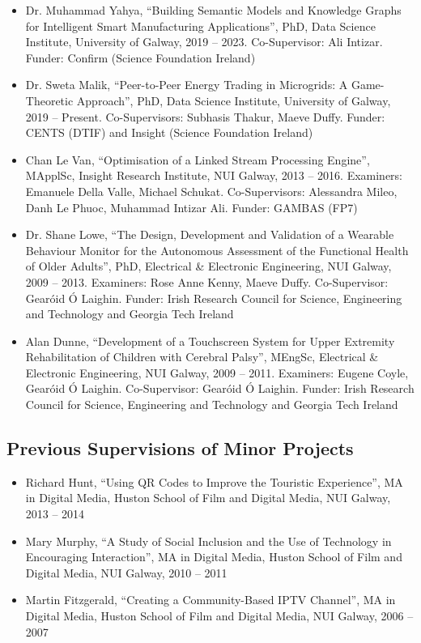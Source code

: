 \documentclass[10pt,a4paper]{res} %
\begin{document}
\begin{resume}
\begin{itemize} \itemsep -2pt
\item Dr. Muhammad Yahya, ``Building Semantic Models and Knowledge Graphs for Intelligent Smart Manufacturing Applications'', PhD, Data Science Institute, University of Galway, 2019 -- 2023. Co-Supervisor: Ali Intizar. Funder: Confirm (Science Foundation Ireland) %
\item Dr. Sweta Malik, ``Peer-to-Peer Energy Trading in Microgrids: A Game-Theoretic Approach'', PhD, Data Science Institute, University of Galway, 2019 -- Present. Co-Supervisors: Subhasis Thakur, Maeve Duffy. Funder: CENTS (DTIF) and Insight (Science Foundation Ireland) %
\item Chan Le Van, ``Optimisation of a Linked Stream Processing Engine'', MApplSc, Insight Research Institute, NUI Galway, 2013 -- 2016. Examiners: Emanuele Della Valle, Michael Schukat. Co-Supervisors: Alessandra Mileo, Danh Le Phuoc, Muhammad Intizar Ali. Funder: GAMBAS (FP7)
\item Dr. Shane Lowe, ``The Design, Development and Validation of a Wearable Behaviour Monitor for the Autonomous Assessment of the Functional Health of Older Adults'', PhD, Electrical \& Electronic Engineering, NUI Galway, 2009 -- 2013. Examiners: Rose Anne Kenny, Maeve Duffy. Co-Supervisor: Gear\'{o}id \'{O} Laighin. Funder: Irish Research Council for Science, Engineering and Technology and Georgia Tech Ireland
\item Alan Dunne, ``Development of a Touchscreen System for Upper Extremity Rehabilitation of Children with Cerebral Palsy'', MEngSc, Electrical \& Electronic Engineering, NUI Galway, 2009 -- 2011. Examiners: Eugene Coyle, Gear\'{o}id \'{O} Laighin. Co-Supervisor: Gear\'{o}id \'{O} Laighin. Funder: Irish Research Council for Science, Engineering and Technology and Georgia Tech Ireland
\end{itemize}

\subsection*{Previous Supervisions of Minor Projects}

\begin{itemize} \itemsep -2pt
\item Richard Hunt, ``Using QR Codes to Improve the Touristic Experience'', MA in Digital Media, Huston School of Film and Digital Media, NUI Galway, 2013 -- 2014
\item Mary Murphy, ``A Study of Social Inclusion and the Use of Technology in Encouraging Interaction'', MA in Digital Media, Huston School of Film and Digital Media, NUI Galway, 2010 -- 2011
\item Martin Fitzgerald, ``Creating a Community-Based IPTV Channel'', MA in Digital Media, Huston School of Film and Digital Media, NUI Galway, 2006 -- 2007
\end{itemize}


\end{resume}
\end{document}
